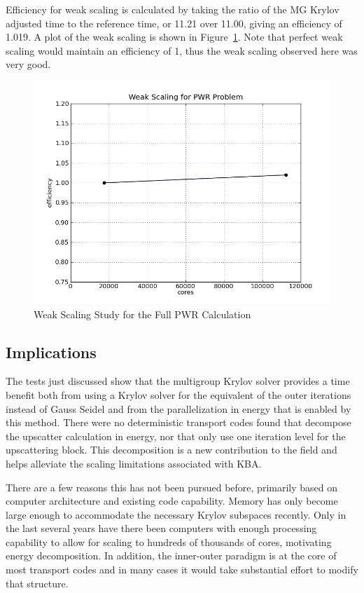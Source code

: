 Efficiency for weak scaling is calculated by taking the ratio of the MG Krylov adjusted time to the reference time, or 11.21 over 11.00, giving an efficiency of 1.019. A plot of the weak scaling is shown in Figure~\ref{fig:PWRweakScaling}. Note that perfect weak scaling would maintain an efficiency of 1, thus the weak scaling observed here was very good. 
%
\begin{figure}[!h]
  \begin{center}
    \includegraphics [width=.8\textwidth, height=0.48\textheight ] {PWRmyWeakScaling}
  \end{center}
  \caption{Weak Scaling Study for the Full PWR Calculation}
  \label{fig:PWRweakScaling}
\end{figure}

\subsection{Implications}
The tests just discussed show that the multigroup Krylov solver provides a time benefit both from using a Krylov solver for the equivalent of the outer iterations instead of Gauss Seidel and from the parallelization in energy that is enabled by this method. There were no deterministic transport codes found that decompose the upscatter calculation in energy, nor that only use one iteration level for the upscattering block. This decomposition is a new contribution to the field and helps alleviate the scaling limitations associated with KBA.   

There are a few reasons this has not been pursued before, primarily based on computer architecture and existing code capability. Memory has only become large enough to accommodate the necessary Krylov subspaces recently. Only in the last several years have there been computers with enough processing capability to allow for scaling to hundreds of thousands of cores, motivating energy decomposition. In addition, the inner-outer paradigm is at the core of most transport codes and in many cases it would take substantial effort to modify that structure. 


